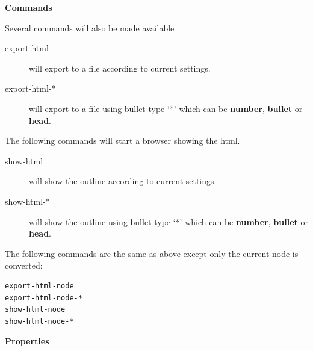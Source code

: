 \documentclass[a4paper,10pt,english]{sphinxmanual}
\begin{document}
\textbf{Commands}

Several commands will also be made available
\begin{description}
\item[{export-html}] \leavevmode
will export to a file according to current settings.

\item[{export-html-*}] \leavevmode
will export to a file using bullet type `*' which can be
\textbf{number}, \textbf{bullet} or \textbf{head}.

\end{description}

The following commands will start a browser showing the html.
\begin{description}
\item[{show-html}] \leavevmode
will show the outline according to current settings.

\item[{show-html-*}] \leavevmode
will show the outline using bullet type `*' which can be
\textbf{number}, \textbf{bullet} or \textbf{head}.

\end{description}

The following commands are the same as above except only the current node is converted:

\begin{Verbatim}[commandchars=\\\{\}]
export-html-node
export-html-node-*
show-html-node
show-html-node-*
\end{Verbatim}

\textbf{Properties}
\end{document}
